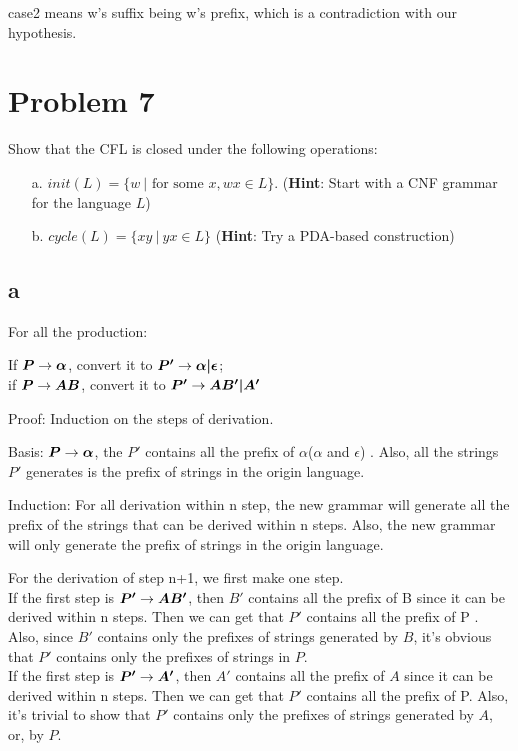 \documentclass[a4paper,UTF8]{ctexart}
\theoremstyle{definition}
\begin{document}
case2 means w's suffix being w's prefix, which is a contradiction with our hypothesis.




\section*{Problem 7}
Show that the CFL is closed under the following operations:
\begin{enumerate}
	\item[a.] $init(L)=\{w\ |\mbox{ for some }x, wx \in L\}$. (\textbf{Hint}: Start with a CNF grammar for the language $L$)
	\item[b.] $cycle(L)=\{xy\ |\ yx \in L\}$ (\textbf{Hint}: Try a PDA-based construction)
\end{enumerate}

\subsection*{a}

For all the production: 

If $\boldsymbol{P} \rightarrow \boldsymbol{\alpha}$, convert it to $\boldsymbol{P'} \rightarrow \boldsymbol{\alpha|\epsilon}$;\\
if $\boldsymbol{P} \rightarrow \boldsymbol{AB}$, convert it to $\boldsymbol{P'} \rightarrow \boldsymbol{AB'|A'}$

Proof:
Induction on the steps of derivation. 

Basis: $\boldsymbol{P} \rightarrow \boldsymbol{\alpha}$, the $P'$ contains all the prefix of $\alpha$($\alpha$ and $\epsilon$) . Also, all
the strings $P'$ generates is the prefix of strings in the origin language.

Induction:
	For all derivation within n step, the new grammar will generate all the prefix
	of the strings that can be derived within n steps. Also, the new grammar will only
	generate the prefix of strings in the origin language.

	For the derivation of step n+1, we first make one step.\\
	If the first step is $\boldsymbol{P'} \rightarrow \boldsymbol{AB'}$, then $B'$ contains all the prefix of B since it
	can be derived within n steps. Then we can get that $P'$ contains all the 
	prefix of P . Also, since $B'$ contains only the prefixes of strings generated by $B$, it's 
	obvious that $P'$ contains only the prefixes of strings in $P$.\\
	If the first step is $\boldsymbol{P'} \rightarrow \boldsymbol{A'}$, then $A'$ contains all the prefix of 
	$A$ since it can be derived within n steps. Then we can get that $P'$ contains all
	the prefix of P. Also, it's trivial to show that $P'$ contains only the prefixes of 
	strings generated by $A$, or, by $P$.
\end{document}
